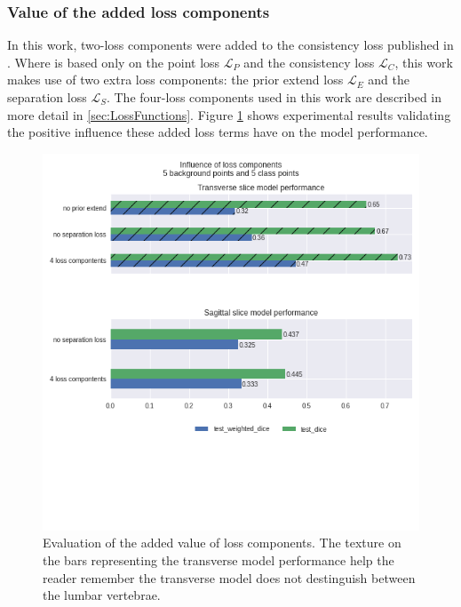 \subsubsection{Value of the added loss components}
\par{
    In this work, two-loss components were added to the consistency loss published in \cite{Laradji2020a}.
    Where \cite{Laradji2020a} is based only on the point loss $\mathcal{L}_P$ and the consistency loss $\mathcal{L}_C$, this work makes use of two extra loss components:
    the prior extend loss $\mathcal{L}_E$ and the separation loss $\mathcal{L}_S$. The four-loss components used in this work are described in more detail in \ref{sec:LossFunctions}.
    Figure \ref{fig:addedLossComponents} shows experimental results validating the positive influence these added loss terms have on the model performance.
}
\begin{figure}
    \centering
    \includegraphics[width=.95\textwidth]{images/Losscomponents.png}
    \caption{Evaluation of the added value of loss components. 
    The texture on the bars representing the transverse model performance help the reader remember the transverse model does not destinguish between the lumbar vertebrae.
    \label{fig:addedLossComponents}}
\end{figure}

